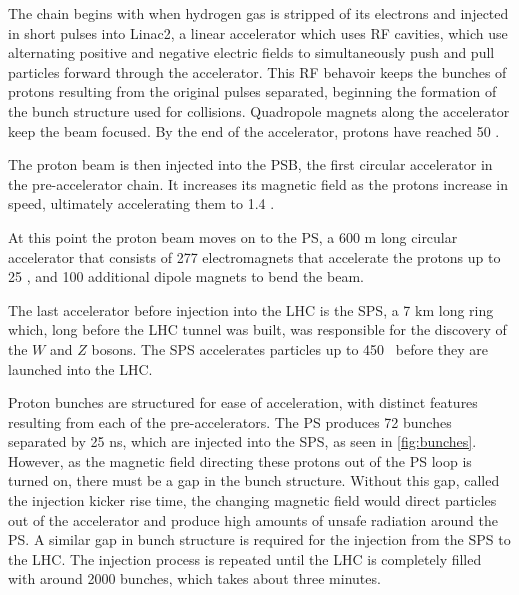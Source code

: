The chain begins with when hydrogen gas is stripped of its electrons and injected in short pulses into Linac2, a linear accelerator which uses \ac{RF} cavities, which use alternating positive and negative electric fields to simultaneously push and pull particles forward through the accelerator. This \ac{RF} behavoir keeps the bunches of protons resulting from the original pulses separated, beginning the formation of the bunch structure used for collisions. Quadropole magnets along the accelerator keep the beam focused. By the end of the accelerator, protons have reached 50 \mev. 

The proton beam is then injected into the \ac{PSB}, the first circular accelerator in the pre-accelerator chain. It increases its magnetic field as the protons increase in speed, ultimately accelerating them to 1.4 \gev. 

At this point the proton beam moves on to the \ac{PS}, a 600 m long circular accelerator that consists of 277 electromagnets that accelerate the protons up to 25 \gev, and 100 additional dipole magnets to bend the beam. 

The last accelerator before injection into the \ac{LHC} is the \ac{SPS}, a 7 km long ring which, long before the \ac{LHC} tunnel was built, was responsible for the discovery of the $W$ and $Z$ bosons. The \ac{SPS} accelerates particles up to 450 \gev~before they are launched into the \ac{LHC}. 

Proton bunches are structured for ease of acceleration, with distinct features resulting from each of the pre-accelerators. The \ac{PS} produces 72 bunches separated by 25 ns, which are injected into the \ac{SPS}, as seen in \autoref{fig:bunches}. However, as the magnetic field directing these protons out of the \ac{PS} loop is turned on, there must be a gap in the bunch structure. Without this gap, called the injection kicker rise time, the changing magnetic field would direct particles out of the accelerator and produce high amounts of unsafe radiation around the \ac{PS}. A similar gap in bunch structure is required for the injection from the \ac{SPS} to the \ac{LHC}. The injection process is repeated until the \ac{LHC} is completely filled with around 2000 bunches, which takes about three minutes.

